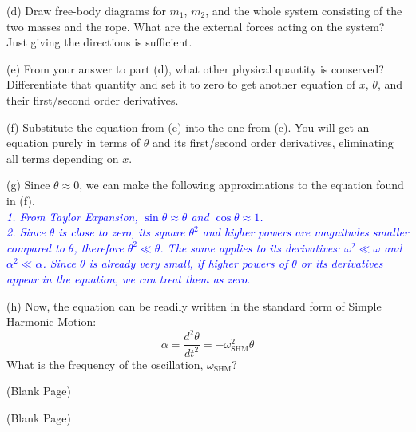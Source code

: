 \documentclass[11pt]{article}
\theoremstyle{gangnamstyle}{\newtheorem{definition}{Definition}[]}
\theoremstyle{gangnamstyle}{\newtheorem{example}{Example}[]}
\theoremstyle{gangnamstyle}{\newtheorem{problem}{Problem}[]}
\begin{document}
(d) Draw free-body diagrams for $m_1$, $m_2$, and the whole system consisting of the two masses and the rope. What are the external forces acting on the system? Just giving the directions is sufficient. 

(e) From your answer to part (d), what other physical quantity is conserved? Differentiate that quantity and set it to zero to get another equation of $x$, $\theta$, and their first/second order derivatives. 

(f) Substitute the equation from (e) into the one from (c). You will get an equation purely in terms of $\theta$ and its first/second order derivatives, eliminating all terms depending on $x$. 

(g) Since $\theta \approx 0$, we can make the following approximations to the equation found in (f). \\
\textcolor{blue}{
\textit{1. From Taylor Expansion, $\sin\theta \approx \theta$ and $\cos\theta \approx 1$. \\
2. Since $\theta$ is close to zero, its square $\theta^2$ and higher powers are magnitudes smaller compared to $\theta$, therefore $\theta^2 \ll \theta$. The same applies to its derivatives: $\omega^2 \ll \omega$ and $\alpha^2 \ll \alpha$. Since $\theta$ is already very small, if higher powers of $\theta$ or its derivatives appear in the equation, we can treat them as zero. }}

(h) Now, the equation can be readily written in the standard form of Simple Harmonic Motion: 
\[ \alpha = \frac{d^2\theta}{dt^2} = -\omega_{\text{SHM}}^2\theta \]
What is the frequency of the oscillation, $\omega_{\text{SHM}}$? 

\pagebreak

\begin{center}
(Blank Page)
\end{center}

\pagebreak

\begin{center}
(Blank Page)
\end{center}

\pagebreak
\end{document}
